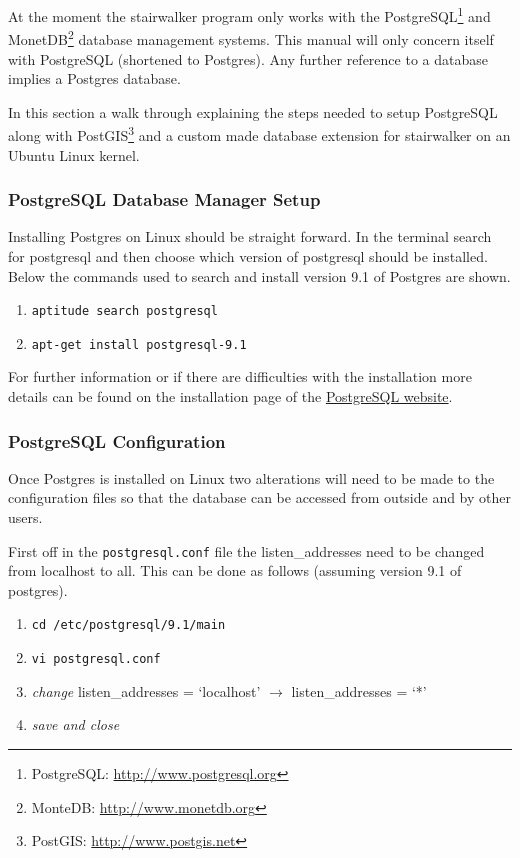 At the moment the stairwalker program only works with the PostgreSQL\footnote{PostgreSQL: \url{http://www.postgresql.org}} and MonetDB\footnote{MonteDB: \url{http://www.monetdb.org}} database management systems. This manual will only concern itself with PostgreSQL (shortened to Postgres). Any further reference to a database implies a Postgres database.

In this section a walk through explaining the steps needed to setup PostgreSQL along with PostGIS\footnote{PostGIS: \url{http://www.postgis.net}} and a custom made database extension for stairwalker on an Ubuntu Linux kernel.

\subsubsection{PostgreSQL Database Manager Setup}
Installing Postgres on Linux should be straight forward. In the terminal search for postgresql and then choose which version of postgresql should be installed. Below the commands used to search and install version 9.1 of Postgres are shown.
\begin{enumerate}
	\item \lstinline|aptitude search postgresql|
	\item \lstinline|apt-get install postgresql-9.1|
\end{enumerate}
For further information or if there are difficulties with the installation more details can be found on the installation page of the \href{http://www.postgresql.org/download/}{PostgreSQL website}.  

\subsubsection{PostgreSQL Configuration}
Once Postgres is installed on Linux two alterations will need to be made to the configuration files so that the database can be accessed from outside and by other users.

First off in the \lstinline|postgresql.conf| file the listen\_addresses need to be changed from localhost to all. This can be done as follows (assuming version 9.1 of postgres).

\begin{enumerate}
	\item \lstinline|cd /etc/postgresql/9.1/main|
	\item \lstinline|vi postgresql.conf|
	\item \textit{change} listen\_addresses = `localhost' $\rightarrow$ listen\_addresses = `*'
	\item \textit{save and close}
\end{enumerate}


